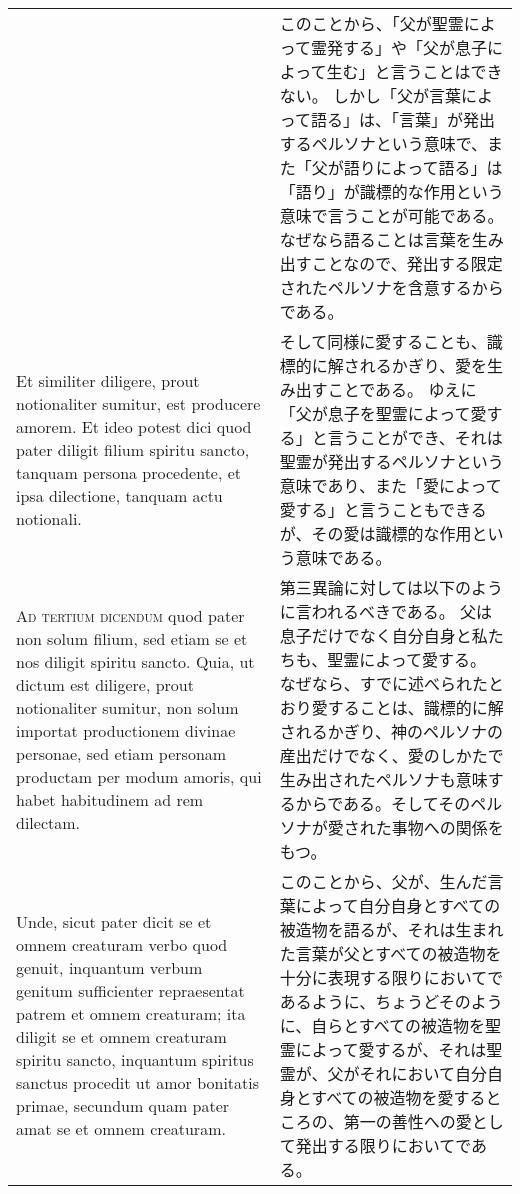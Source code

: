 \documentclass[10pt]{jsarticle} %
\begin{document}
\begin{longtable}{p{21em}p{21em}}
&

このことから、「父が聖霊によって霊発する」や「父が息子によって生む」と言うことはできない。
しかし「父が言葉によって語る」は、「言葉」が発出するペルソナという意味で、また「父が語りによって語る」は「語り」が識標的な作用という意味で言うことが可能である。
なぜなら語ることは言葉を生み出すことなので、発出する限定されたペルソナを含意するからである。


\\


Et similiter diligere, prout notionaliter sumitur, est
 producere amorem. Et ideo potest dici quod pater diligit filium
 spiritu sancto, tanquam persona procedente, et ipsa dilectione,
 tanquam actu notionali.


&

そして同様に愛することも、識標的に解されるかぎり、愛を生み出すことである。
ゆえに「父が息子を聖霊によって愛する」と言うことができ、それは聖霊が発出するペルソナという意味であり、また「愛によって愛する」と言うこともできるが、その愛は識標的な作用という意味である。


\\

{\scshape Ad tertium dicendum} quod pater non solum filium, sed etiam se et nos
 diligit spiritu sancto. Quia, ut dictum est diligere, prout
 notionaliter sumitur, non solum importat productionem divinae
 personae, sed etiam personam productam per modum amoris, qui habet
 habitudinem ad rem dilectam. 

&

第三異論に対しては以下のように言われるべきである。
父は息子だけでなく自分自身と私たちも、聖霊によって愛する。
なぜなら、すでに述べられたとおり愛することは、識標的に解されるかぎり、神のペルソナの産出だけでなく、愛のしかたで生み出されたペルソナも意味するからである。そしてそのペルソナが愛された事物への関係をもつ。



\\


Unde, sicut pater dicit se et omnem
 creaturam verbo quod genuit, inquantum verbum genitum sufficienter
 repraesentat patrem et omnem creaturam; ita diligit se et omnem
 creaturam spiritu sancto, inquantum spiritus sanctus procedit ut amor
 bonitatis primae, secundum quam pater amat se et omnem creaturam. 

&

このことから、父が、生んだ言葉によって自分自身とすべての被造物を語るが、それは生まれた言葉が父とすべての被造物を十分に表現する限りにおいてであるように、ちょうどそのように、自らとすべての被造物を聖霊によって愛するが、それは聖霊が、父がそれにおいて自分自身とすべての被造物を愛するところの、第一の善性への愛として発出する限りにおいてである。



\end{longtable}
\end{document}
